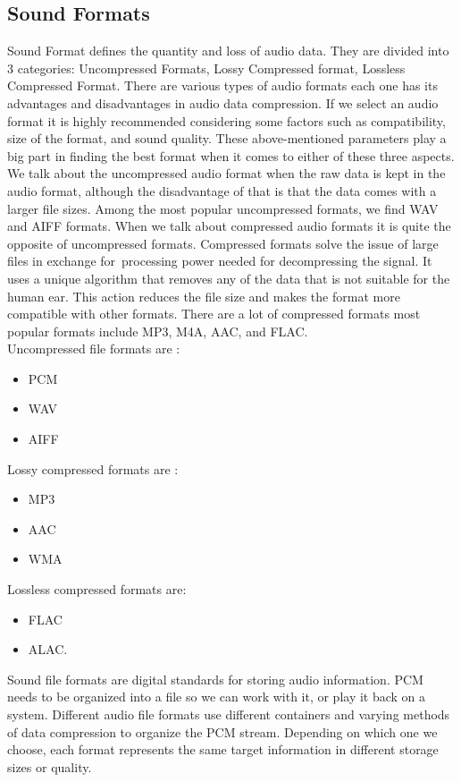 \documentclass[english,12pt,oneside,a4paper]{article}
\begin{document}
		\subsection{Sound Formats}
		Sound Format defines the  quantity and loss of audio data.
		They are divided into 3 categories: Uncompressed Formats,	Lossy Compressed format, Lossless Compressed Format.
		There are various types of audio formats each one has its advantages and disadvantages in audio data compression. If we select an audio format it is highly recommended considering some factors such as compatibility, size of the format, and sound quality. These above-mentioned parameters play a big part in finding the best format when it comes to either of these three aspects. We talk about the uncompressed audio format when the raw data is kept in the audio format, although the disadvantage of that is that the data comes with a larger file sizes. Among the most popular uncompressed formats, we find WAV and AIFF formats. When we talk about compressed audio formats it is quite the opposite of uncompressed formats. Compressed formats solve the issue of large files in exchange for~processing power needed for decompressing the signal. It uses a unique algorithm that removes any of the data that is not suitable for the human ear. This action reduces the file size and makes the format more compatible with other formats. There are a lot of compressed formats most popular formats include  MP3, M4A, AAC, and FLAC.
		\\
		Uncompressed file formats are :
		\begin{itemize}
		\item PCM
		\item WAV 
		\item AIFF
		\end{itemize}
		Lossy compressed formats are : 
		\begin{itemize}
		\item MP3
		\item AAC
		\item WMA
		\end{itemize}
		Lossless compressed formats are:
		\begin{itemize}
		\item FLAC
		\item ALAC.
		\end{itemize}
		
		Sound file formats are digital standards for storing audio information. PCM needs to be organized into a file so we can work with it, or play it back on a system. Different audio file formats use different containers and varying methods of data compression to organize the PCM stream. Depending on which one we choose, each format represents the same target information in different storage sizes or quality.
		
\end{document}
